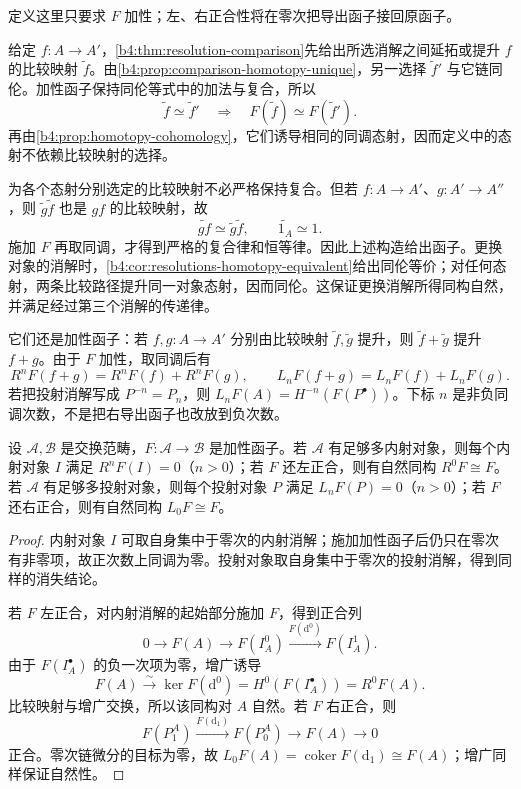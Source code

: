 定义这里只要求 \(F\) 加性；左、右正合性将在零次把导出函子接回原函子。

\ProseParagraphBreak
给定 \(f:A\to A'\)，\cref{b4:thm:resolution-comparison}先给出所选消解之间延拓或提升 \(f\) 的比较映射 \(\widetilde f\)。由\cref{b4:prop:comparison-homotopy-unique}，另一选择 \(\widetilde f'\) 与它链同伦。加性函子保持同伦等式中的加法与复合，所以
\[
	\widetilde f\simeq\widetilde f' \quad\Longrightarrow\quad F(\widetilde f)\simeq F(\widetilde f').
\]
再由\cref{b4:prop:homotopy-cohomology}，它们诱导相同的同调态射，因而定义中的态射不依赖比较映射的选择。

\ProseParagraphBreak
为各个态射分别选定的比较映射不必严格保持复合。但若 \(f:A\to A'\)、\(g:A'\to A''\)，则 \(\widetilde g\widetilde f\) 也是 \(gf\) 的比较映射，故
\[
	\widetilde{gf}\simeq\widetilde g\widetilde f, \qquad \widetilde{1_A}\simeq1.
\]
施加 \(F\) 再取同调，才得到严格的复合律和恒等律。因此上述构造给出函子。更换对象的消解时，\cref{b4:cor:resolutions-homotopy-equivalent}给出同伦等价；对任何态射，两条比较路径提升同一对象态射，因而同伦。这保证更换消解所得同构自然，并满足经过第三个消解的传递律。

\ProseParagraphBreak
它们还是加性函子：若 \(f,g:A\to A'\) 分别由比较映射 \(\widetilde f,\widetilde g\) 提升，则 \(\widetilde f+\widetilde g\) 提升 \(f+g\)。由于 \(F\) 加性，取同调后有
\[
	R^nF(f+g)=R^nF(f)+R^nF(g),\qquad L_nF(f+g)=L_nF(f)+L_nF(g).
\]
若把投射消解写成 \(P^{-n}=P_n\)，则 \(L_nF(A)=H^{-n}(F(P^\bullet))\)。下标 \(n\) 是非负同调次数，不是把右导出函子也改放到负次数。

\begin{proposition}\label{b4:prop:derived-degree-zero}
	设 \(\mathcal A,\mathcal B\) 是交换范畴，\(F:\mathcal A\to\mathcal B\) 是加性函子。若 \(\mathcal A\) 有足够多内射对象，则每个内射对象 \(I\) 满足 \(R^nF(I)=0\)（\(n>0\)）；若 \(F\) 还左正合，则有自然同构 \(R^0F\cong F\)。若 \(\mathcal A\) 有足够多投射对象，则每个投射对象 \(P\) 满足 \(L_nF(P)=0\)（\(n>0\)）；若 \(F\) 还右正合，则有自然同构 \(L_0F\cong F\)。
\end{proposition}
\begin{proof}
	内射对象 \(I\) 可取自身集中于零次的内射消解；施加加性函子后仍只在零次有非零项，故正次数上同调为零。投射对象取自身集中于零次的投射消解，得到同样的消失结论。

	若 \(F\) 左正合，对内射消解的起始部分施加 \(F\)，得到正合列
	\[
		0\longrightarrow F(A)\longrightarrow F(I_A^0) \xrightarrow{F(\mathrm{d}^0)}F(I_A^1).
	\]
	由于 \(F(I_A^\bullet)\) 的负一次项为零，增广诱导
	\[
		F(A)\xrightarrow{\sim}\ker F(\mathrm{d}^0) =H^0(F(I_A^\bullet))=R^0F(A).
	\]
	比较映射与增广交换，所以该同构对 \(A\) 自然。若 \(F\) 右正合，则
	\[
		F(P_1^A)\xrightarrow{F(\mathrm{d}_1)}F(P_0^A) \longrightarrow F(A)\longrightarrow0
	\]
	正合。零次链微分的目标为零，故 \(L_0F(A)=\operatorname{coker}F(\mathrm{d}_1)\cong F(A)\)；增广同样保证自然性。
\end{proof}

